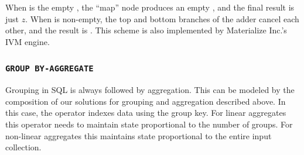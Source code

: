 \begin{center}
\end{center}

\noindent When  is the empty \zr, the ``map'' node produces
an empty \zr, and the final result is just $z$.  When  is
non-empty, the top and bottom branches of the adder cancel each other,
and the result is .  This scheme is also implemented by
Materialize Inc.'s IVM engine.

\subsubsection{\texttt{GROUP BY-AGGREGATE}}

Grouping in SQL is always followed by aggregation.  This can be
modeled by the composition of our solutions for grouping and
aggregation described above.  In this case, the  operator
indexes data using the group key.  For linear aggregates this operator
needs to maintain state proportional to the number of groups.  For
non-linear aggregates this maintains state proportional to the entire
input collection.


